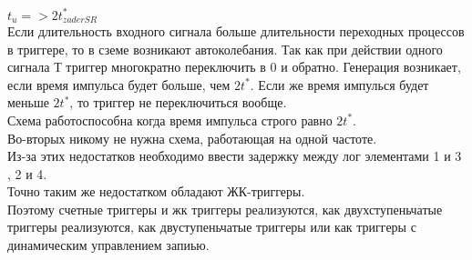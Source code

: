 $t_{u} => 2t^*_{zaderSR}$\\

Если длительность входного сигнала больше длительности переходных процессов в триггере, то в сземе возникают автоколебания.
Так как при действии одного сигнала Т триггер многократно переключить в 0 и обратно.
Генерация возникает, если время импульса будет больше, чем $2t^*$.
Если же время импулься будет меньше $2t^*$, то триггер не переключиться вообще.\\
Схема работоспособна когда время импульса строго равно  $2t^*$.\\
Во-вторых никому не нужна схема, работающая на одной частоте.\\


Из-за этих недостатков необходимо ввести задержку между лог элементами 1 и 3 , 2 и 4. \\
Точно таким же недостатком обладают ЖК-триггеры. \\
Поэтому счетные триггеры и жк триггеры реализуются, как двухступеньчатые триггеры реализуются, как двуступеньчатые триггеры или
как триггеры с динамическим управлением запиью.
